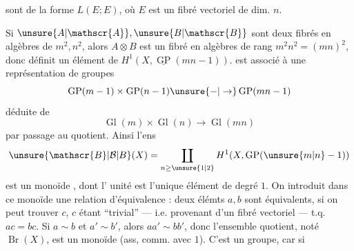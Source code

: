 sont de la forme $L(E;E)$, où $E$ est un fibré vectoriel de dim. $n$.

Si $\unsure{A|\mathscr{A}},\unsure{B|\mathscr{B}}$ sont deux fibrés en algèbres de  $m^2,n^2$, alors $A\otimes B$ est un fibré en algèbres de rang $m^2n^2=(mn)^2$, donc définit un élément de $H^1(X,\underline{\operatorname{GP}}(mn-1))$.  est associé à une représentation de groupes
\[
\operatorname{GP}(m-1)\times\operatorname{GP}(n-1)\unsure{-|\to}\operatorname{GP}(mn-1)
\]
déduite de
\[
\operatorname{Gl}(m)\times\operatorname{Gl}(n)\longrightarrow\operatorname{Gl}(mn)
\]
par passage au quotient. Ainsi l'ens
\[
\unsure{\mathscr{B}|\mathcal{B}|B}(X)=\coprod_{n\geq\unsure{1|2}}H^1(X,\operatorname{GP}(\unsure{m|n}-1))
\]
est un monoïde , dont l' unité est l'unique élément de degré $1$. On  introduit dans ce monoïde une relation d'équivalence : deux  élémts $a,b$ sont équivalents, si on peut trouver $c$, $c$ étant ``trivial'' --- i.e. provenant d'un fibré vectoriel --- t.q. $ac=bc$. Si $a\sim b$ et $a'\sim b'$, alors $aa'\sim bb'$, donc l'ensemble quotient, noté $\operatorname{Br}(X)$, est un monoïde  (ass, comm. avec $1$). C'est  un groupe, car si

